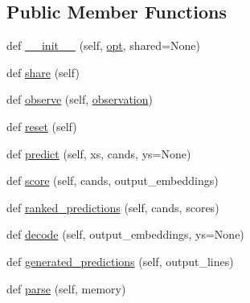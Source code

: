 \subsection*{Public Member Functions}
\begin{DoxyCompactItemize}
\item 
def \hyperlink{classparlai_1_1agents_1_1legacy__agents_1_1memnn_1_1memnn__v0_1_1MemnnAgent_ac63a554810de551cf9c90d85fefa50d1}{\+\_\+\+\_\+init\+\_\+\+\_\+} (self, \hyperlink{classparlai_1_1agents_1_1legacy__agents_1_1memnn_1_1memnn__v0_1_1MemnnAgent_ae9e5ceae9adbc5b2e18dfc37da457e3a}{opt}, shared=None)
\item 
def \hyperlink{classparlai_1_1agents_1_1legacy__agents_1_1memnn_1_1memnn__v0_1_1MemnnAgent_a64ae5911364ed06f2a72afe9859e6cdd}{share} (self)
\item 
def \hyperlink{classparlai_1_1agents_1_1legacy__agents_1_1memnn_1_1memnn__v0_1_1MemnnAgent_a0f8358dd299ba6719f7354771938fd7b}{observe} (self, \hyperlink{classparlai_1_1agents_1_1legacy__agents_1_1memnn_1_1memnn__v0_1_1MemnnAgent_afa839a741742c292916a7fce23c71a31}{observation})
\item 
def \hyperlink{classparlai_1_1agents_1_1legacy__agents_1_1memnn_1_1memnn__v0_1_1MemnnAgent_ad365b2e33983158fbf7581d361a74246}{reset} (self)
\item 
def \hyperlink{classparlai_1_1agents_1_1legacy__agents_1_1memnn_1_1memnn__v0_1_1MemnnAgent_a4e850d51ca01adc45754cc509c8b096a}{predict} (self, xs, cands, ys=None)
\item 
def \hyperlink{classparlai_1_1agents_1_1legacy__agents_1_1memnn_1_1memnn__v0_1_1MemnnAgent_a29485cab795b6c8abe0a61d9c6bb87fd}{score} (self, cands, output\+\_\+embeddings)
\item 
def \hyperlink{classparlai_1_1agents_1_1legacy__agents_1_1memnn_1_1memnn__v0_1_1MemnnAgent_aeca21a7823ef27e0f56ac7e420e2beca}{ranked\+\_\+predictions} (self, cands, scores)
\item 
def \hyperlink{classparlai_1_1agents_1_1legacy__agents_1_1memnn_1_1memnn__v0_1_1MemnnAgent_ae18c65a307c2a3c164beb6cf0bb5b62b}{decode} (self, output\+\_\+embeddings, ys=None)
\item 
def \hyperlink{classparlai_1_1agents_1_1legacy__agents_1_1memnn_1_1memnn__v0_1_1MemnnAgent_a15b8b76a2d2ae5e0a4de2978e5ac0ac5}{generated\+\_\+predictions} (self, output\+\_\+lines)
\item 
def \hyperlink{classparlai_1_1agents_1_1legacy__agents_1_1memnn_1_1memnn__v0_1_1MemnnAgent_a5e9b6393cb251b6030bb9a0db51b8026}{parse} (self, memory)

\end{DoxyCompactItemize}
